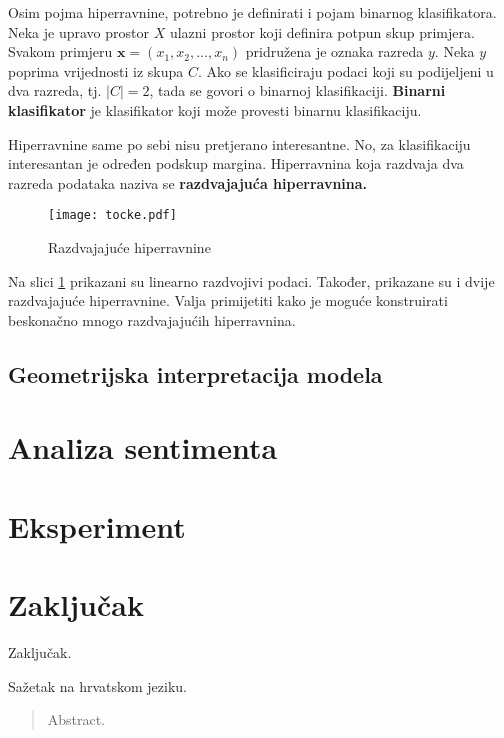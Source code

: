\documentclass[times, utf8, zavrsni, numeric]{fer}
\newcommand{\matr}[1]{\mathbf{#1}}
\begin{document}
\par Osim pojma hiperravnine, potrebno je definirati i pojam binarnog klasifikatora. 
Neka je upravo prostor $\textit{X}$ ulazni prostor koji definira potpun skup primjera. 
Svakom primjeru $\matr{x}=(x_1,x_2,\dots,x_n)$ pridružena je oznaka razreda $y$. 
Neka $y$ poprima vrijednosti iz skupa $\textit{C}$. 
Ako se klasificiraju podaci koji su podijeljeni u dva razreda, tj. $\left\vert{C}\right\vert=2$, tada se govori o binarnoj klasifikaciji. 
\textbf{Binarni klasifikator} je klasifikator koji može provesti binarnu klasifikaciju. 

\par Hiperravnine same po sebi nisu pretjerano interesantne. 
No, za klasifikaciju interesantan je određen podskup margina. 
Hiperravnina koja razdvaja dva razreda podataka naziva se \textbf{razdvajajuća hiperravnina.}

\begin{figure}
\centering
\texttt{[image: tocke.pdf]}
\caption{Razdvajajuće hiperravnine}
\label{fig:hrav}
\end{figure}

Na slici \ref{fig:hrav} prikazani su linearno razdvojivi podaci. 
Također, prikazane su i dvije razdvajajuće hiperravnine. 
Valja primijetiti kako je moguće konstruirati beskonačno mnogo razdvajajućih hiperravnina.

\par 



\section{Geometrijska interpretacija modela} \label{ginter}

\chapter{Analiza sentimenta} \label{sentiment}

\chapter{Eksperiment} \label{eksperiment}

\chapter{Zaključak} \label{zakljucak}
Zaključak.




\begin{sazetak}
Sažetak na hrvatskom jeziku.

\end{sazetak}

\begin{abstract}
Abstract.

\end{abstract}
\end{document}
